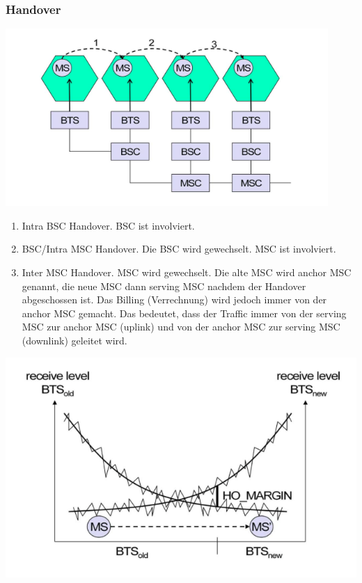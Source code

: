 \subsubsection{Handover}
\begin{minipage}{0.5 \linewidth}
\includegraphics[width = \linewidth]{./Pics/GSMHandover}
\end{minipage}
\begin{minipage}{0.5 \linewidth}
\begin{enumerate}
\item Intra BSC Handover. BSC ist involviert.
\item BSC/Intra MSC Handover. Die BSC wird gewechselt. MSC ist involviert.
\item Inter MSC Handover. MSC wird gewechselt. Die alte MSC wird anchor MSC genannt, die neue MSC dann serving MSC nachdem der Handover abgeschossen ist. Das Billing (Verrechnung) wird jedoch immer von der anchor MSC gemacht. Das bedeutet, dass der Traffic immer von der serving MSC zur anchor MSC (uplink) und von der anchor MSC zur serving MSC (downlink) geleitet wird.
\end{enumerate}
\end{minipage}
\begin{minipage}{0.5 \linewidth}
\includegraphics[width = \linewidth]{./Pics/GSMHandover2}
\end{minipage}
